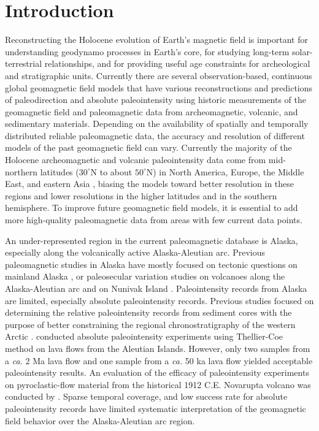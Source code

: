 \documentclass[draft]{agujournal2019}
\begin{document}
\section{Introduction}
Reconstructing the Holocene evolution of Earth's magnetic field is important for understanding geodynamo processes in Earth's core, for studying long-term solar-terrestrial relationships, and for providing useful age constraints for archeological and stratigraphic units. Currently there are several observation-based, continuous global geomagnetic field models \cite{Constable2016a,Korte2009a,Korte2011a,Korte2011b,Pavon-Carrasco2014a,Nilsson2014a} that have various reconstructions and predictions of paleodirection and absolute paleointensity using historic measurements of the geomagnetic field and paleomagnetic data from archeomagnetic, volcanic, and sedimentary materials. Depending on the availability of spatially and temporally distributed reliable paleomagnetic data, the accuracy and resolution of different models of the past geomagnetic field can vary. Currently the majority of the Holocene archeomagnetic and volcanic paleointensity data come from mid-northern latitudes ($30^{\circ}$N to about $50^{\circ}$N) in North America, Europe, the Middle East, and eastern Asia \cite{Brown2015a, Brown2015b}, biasing the models toward better resolution in these regions and lower resolutions in the higher latitudes and in the southern hemisphere. To improve future geomagnetic field models, it is essential to add more high-quality paleomagnetic data from areas with few current data points.

An under-represented region in the current paleomagnetic  database is Alaska, especially along the volcanically active Alaska-Aleutian arc. Previous paleomagnetic studies in Alaska  have mostly focused on tectonic questions on mainland Alaska \cite{Packer1974a,Hillhouse1980a,Thrupp1986a,Stamatakos2001a}, or paleosecular variation studies on volcanoes along the Alaska-Aleutian arc \cite{Stone1979a,Bingham1972a,Stone2006a} and on Nunivak Island \cite{Coe2000,Johnson2008a}. Paleointensity records from Alaska are limited, especially absolute paleointensity records. Previous studies focused on determining the relative paleointensity records from sediment cores with the purpose of better constraining the regional chronostratigraphy of the western Arctic \cite{Barletta2008a, Lise-Pronovost2009a}.  conducted absolute paleointensity experiments using Thellier-Coe method \cite{Coe1967b} on lava flows from the Aleutian Islands. However, only two samples from a \textit{ca.} 2 Ma lava flow and one sample from a \textit{ca.} 50 ka lava flow yielded acceptable paleointensity results. An evaluation of the efficacy of paleointensity experiments on pyroclastic-flow material from the historical 1912 C.E. Novarupta volcano was conducted by .  Sparse temporal coverage, and low success rate for absolute paleointensity records have limited  systematic interpretation of the geomagnetic field behavior over the Alaska-Aleutian arc region.
\end{document}
